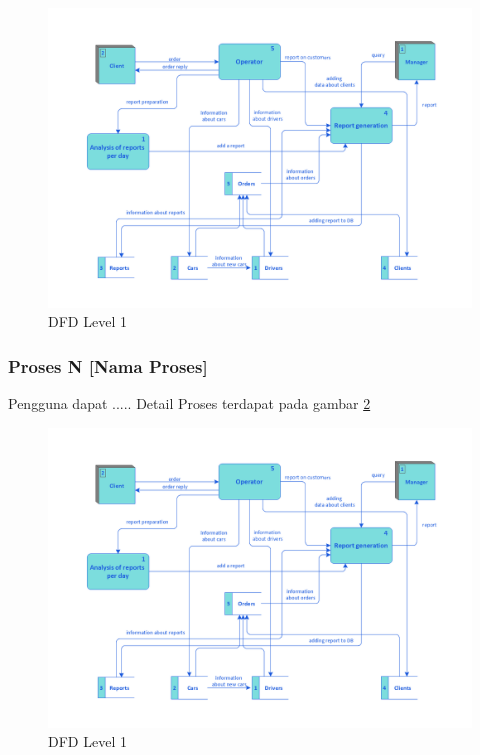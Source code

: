       \begin{figure}[H]
        \centering
        \includegraphics[width=\linewidth]{images/bab3/Taxi-service-dfd.png}
        \caption{DFD Level 1}
        \label{dfd1a}
      \end{figure}
      
  \subsubsection{Proses N [Nama Proses]}
  Pengguna dapat ..... Detail Proses terdapat pada gambar \ref{dfd1n}
      \begin{figure}[H]
        \centering
        \includegraphics[width=\linewidth]{images/bab3/Taxi-service-dfd.png}
        \caption{DFD Level 1}
        \label{dfd1n}
      \end{figure}
  
